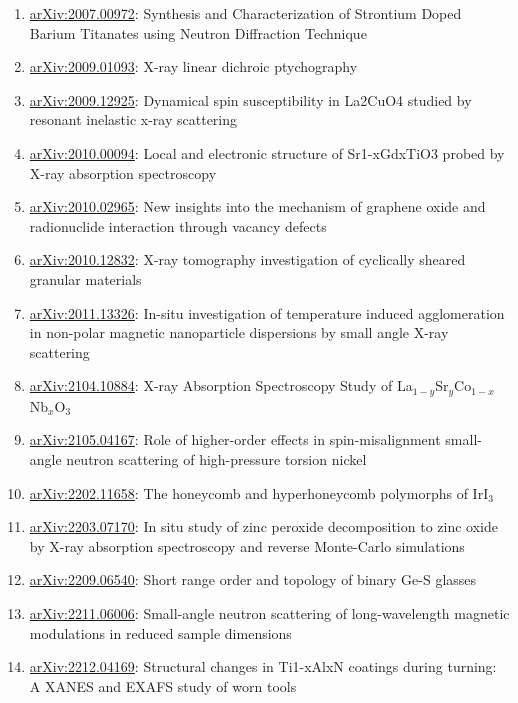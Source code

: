 \begin{small}
\begin{enumerate}
  \item \href{https://arxiv.org/abs/2007.00972}{arXiv:2007.00972}: Synthesis and Characterization of Strontium Doped Barium Titanates using Neutron Diffraction Technique
  \item \href{https://arxiv.org/abs/2009.01093}{arXiv:2009.01093}: X-ray linear dichroic ptychography
  \item \href{https://arxiv.org/abs/2009.12925}{arXiv:2009.12925}: Dynamical spin susceptibility in La2CuO4 studied by resonant inelastic x-ray scattering
  \item \href{https://arxiv.org/abs/2010.00094}{arXiv:2010.00094}: Local and electronic structure of Sr1-xGdxTiO3 probed by X-ray absorption spectroscopy
  \item \href{https://arxiv.org/abs/2010.02965}{arXiv:2010.02965}: New insights into the mechanism of graphene oxide and radionuclide interaction through vacancy defects
  \item \href{https://arxiv.org/abs/2010.12832}{arXiv:2010.12832}: X-ray tomography investigation of cyclically sheared granular materials
  \item \href{https://arxiv.org/abs/2011.13326}{arXiv:2011.13326}: In-situ investigation of temperature induced agglomeration in non-polar magnetic nanoparticle dispersions by small angle X-ray scattering
  \item \href{https://arxiv.org/abs/2104.10884}{arXiv:2104.10884}: X-ray Absorption Spectroscopy Study of La$_{1-y}$Sr$_{y}$Co$_{1-x}$Nb$_x$O$_3$
  \item \href{https://arxiv.org/abs/2105.04167}{arXiv:2105.04167}: Role of higher-order effects in spin-misalignment small-angle neutron scattering of high-pressure torsion nickel
  \item \href{https://arxiv.org/abs/2202.11658}{arXiv:2202.11658}: The honeycomb and hyperhoneycomb polymorphs of IrI$_3$
  \item \href{https://arxiv.org/abs/2203.07170}{arXiv:2203.07170}: In situ study of zinc peroxide decomposition to zinc oxide by X-ray absorption spectroscopy and reverse Monte-Carlo simulations
  \item \href{https://arxiv.org/abs/2209.06540}{arXiv:2209.06540}: Short range order and topology of binary Ge-S glasses
  \item \href{https://arxiv.org/abs/2211.06006}{arXiv:2211.06006}: Small-angle neutron scattering of long-wavelength magnetic modulations in reduced sample dimensions
  \item \href{https://arxiv.org/abs/2212.04169}{arXiv:2212.04169}: Structural changes in Ti1-xAlxN coatings during turning: A XANES and EXAFS study of worn tools

\end{enumerate}
\end{small}
